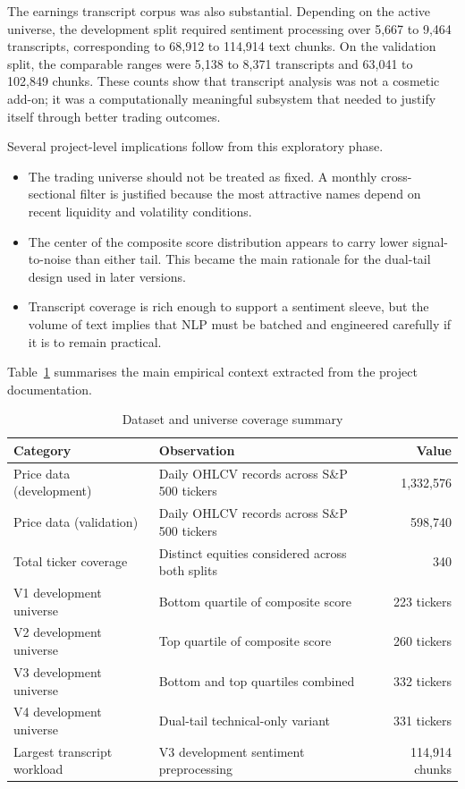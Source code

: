 \documentclass[11pt,twoside,a4paper]{article}
\begin{document}
The earnings transcript corpus was also substantial. Depending on the active universe, the development split required sentiment processing over 5,667 to 9,464 transcripts, corresponding to 68,912 to 114,914 text chunks. On the validation split, the comparable ranges were 5,138 to 8,371 transcripts and 63,041 to 102,849 chunks. These counts show that transcript analysis was not a cosmetic add-on; it was a computationally meaningful subsystem that needed to justify itself through better trading outcomes.

Several project-level implications follow from this exploratory phase.
\begin{itemize}
    \item The trading universe should not be treated as fixed. A monthly cross-sectional filter is justified because the most attractive names depend on recent liquidity and volatility conditions.
    \item The center of the composite score distribution appears to carry lower signal-to-noise than either tail. This became the main rationale for the dual-tail design used in later versions.
    \item Transcript coverage is rich enough to support a sentiment sleeve, but the volume of text implies that NLP must be batched and engineered carefully if it is to remain practical.
\end{itemize}

Table~\ref{tab:eda-summary} summarises the main empirical context extracted from the project documentation.

\begin{table}[h]
\centering
\caption{Dataset and universe coverage summary}
\label{tab:eda-summary}
\begin{tabularx}{\textwidth}{@{}lXr@{}}
\toprule
Category & Observation & Value \\
\midrule
Price data (development) & Daily OHLCV records across S\&P 500 tickers & 1,332,576 \\
Price data (validation) & Daily OHLCV records across S\&P 500 tickers & 598,740 \\
Total ticker coverage & Distinct equities considered across both splits & 340 \\
V1 development universe & Bottom quartile of composite score & 223 tickers \\
V2 development universe & Top quartile of composite score & 260 tickers \\
V3 development universe & Bottom and top quartiles combined & 332 tickers \\
V4 development universe & Dual-tail technical-only variant & 331 tickers \\
Largest transcript workload & V3 development sentiment preprocessing & 114,914 chunks \\
\bottomrule
\end{tabularx}
\end{table}
\end{document}
